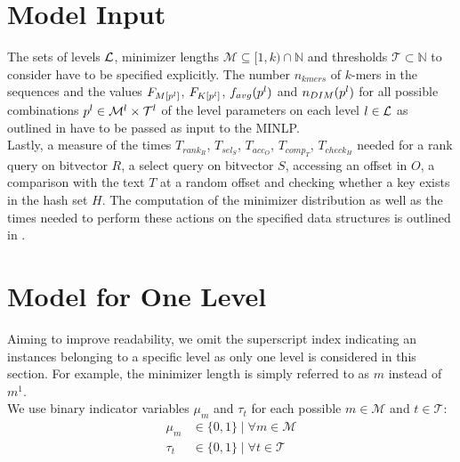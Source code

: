 \documentclass[a4paper,titlepage,onecolumn,oneside,12pt,nenglish,titlepage=firstiscover]{scrbook}
\theoremstyle{plain} %
\theoremstyle{definition} %
\theoremstyle{remark} %
\theoremstyle{plain}
\newcommand{\NN}{\mathbb{N}} %
\newcommand{\minimizerLength}{m}
\newcommand{\threshold}{t}
\newcommand{\level}{l}
\newcommand{\access}{acc}
\newcommand{\contains}{rank}
\newcommand{\select}{sel}
\newcommand{\compare}{comp}
\newcommand{\timeForOperationOnStructure}[2]{T_{#1_{#2}}} %
\newcommand{\averageFrequency}{f_{avg}}
\newcommand{\possibleMinimizerLengths}{\mathcal{M}}
\newcommand{\possibleThresholds}{\mathcal{T}}
\newcommand{\indicatorm}{\mu}
\newcommand{\indicatort}{\tau}
\begin{document}
\section{Model Input}\label{sec:minlp_modelInput}
\newcommand{\nkmers}{n_{kmers}}
The sets of levels $\mathcal{L}$, minimizer lengths $\possibleMinimizerLengths \subseteq [1,k) \cap \NN$ and thresholds $\possibleThresholds \subset \NN$ to consider have to be specified explicitly. The number $\nkmers$ of $k$-mers in the sequences and the values $\CDF{\compactZV{M}{\levelParameters{\level}}}$, $\CDF{\compactZV{K}{\levelParameters{\level}}}$,  $\averageFrequency(\levelParameters{\level})$ and $\numberOfDistinctMinimizers{\levelParameters{\level}}$ for all possible combinations $\levelParameters{\level} \in \possibleMinimizerLengths^\level \times \possibleThresholds^\level$ of the level parameters on each level $\level \in \setOfLevels$ as outlined in  have to be passed as input to the MINLP.\\
Lastly, a measure of the times 
$\timeForOperationOnStructure{\contains}{R}$,
$\timeForOperationOnStructure{\select}{S}$,
$\timeForOperationOnStructure{\access}{O}$,
$\timeForOperationOnStructure{\compare}{T}$,
$\timeForOperationOnStructure{check}{H}$
needed for a rank query on bitvector $R$, a select query on bitvector $S$, accessing an offset in $O$, a comparison with the text $T$ at a random offset and checking whether a key exists in the hash set $H$. The computation of the minimizer distribution as well as the times needed to perform these actions on the specified data structures is outlined in .

\section{Model for One Level}\label{sec:minlp_oneLevel}
Aiming to improve readability, we omit the superscript index indicating an instances belonging to a specific level as only one level is considered in this section. For example, the minimizer length is simply referred to as $\minimizerLength$ instead of $\minimizerLength^1$.\\

We use binary indicator variables $\indicatorm_\minimizerLength$ and $\indicatort_\threshold$ for each possible $\minimizerLength \in \possibleMinimizerLengths$ and $\threshold \in \possibleThresholds$:
\begin{align}
	\indicatorm_\minimizerLength &\in \{0,1\} \mid \forall \minimizerLength \in \possibleMinimizerLengths \label{variable:indicatorsM}\\
	\indicatort_\threshold &\in \{0,1\} \mid \forall \threshold \in \possibleThresholds \label{variable:indicatorsT}
\end{align} 
\end{document}

